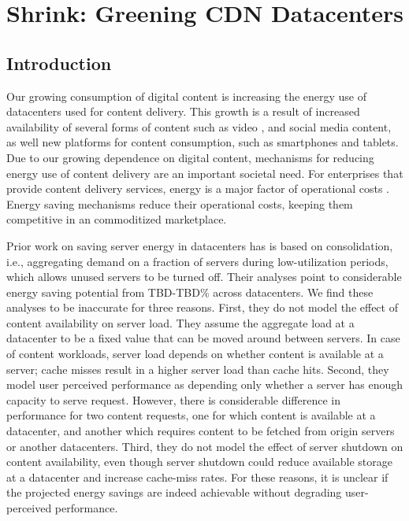 \chapter{Shrink: Greening CDN Datacenters}
\section{Introduction}


Our growing consumption of digital content  is increasing the energy use of datacenters used for content delivery. This growth is a result of increased availability of several forms of content such as video \cite{nielsen-video-growth}, and social media content, as well new platforms for content consumption, such as smartphones and tablets. Due to our growing dependence on digital content, mechanisms for reducing energy use of content delivery are an important societal need. For enterprises that provide content delivery  services, energy is a major factor of operational costs \cite{mathew12}. Energy saving mechanisms reduce their operational costs, keeping them competitive in an commoditized marketplace.

Prior work on  saving server energy in datacenters has is based on consolidation, i.e., aggregating demand on a fraction of servers during low-utilization periods, which allows unused servers to be turned off. Their analyses point to considerable energy saving potential from TBD-TBD\% across datacenters. We find these analyses to be inaccurate for three reasons. First, they do not model the effect of content availability on server load.  They assume the aggregate load at a datacenter to be a fixed value that can be moved around between servers. In case of content workloads, server load depends on whether content is available at a server; cache misses result in a higher server load than cache hits.  Second, they model user perceived performance as depending only whether a server has enough capacity to serve request. However, there is considerable difference in performance for two content requests, one for which content is available at a datacenter, and another which requires content to be fetched from origin servers or another datacenters. Third, they do not model the effect of server shutdown on content availability, even though server shutdown could reduce available storage at a datacenter and increase cache-miss rates. For these reasons, it is unclear if the projected energy savings are indeed achievable without degrading user-perceived performance. 


